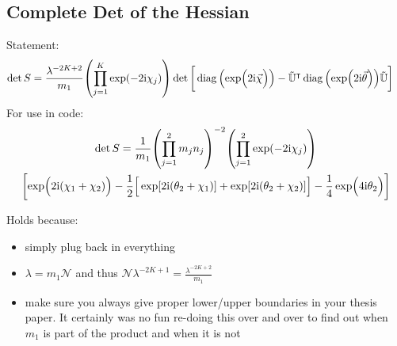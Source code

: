 \documentclass[
	english,
	a4paper,
	fontsize=10pt,
	parskip=half,
	titlepage=true,
	DIV=12,
	final
]{scrreprt}
\newcommand*{\transp}{\ensuremath{^\intercal}}
\newcommand*{\iunit}{\ensuremath{\mathrm{i}}}
\DeclareMathOperator{\diag}{diag}
\begin{document}
\subsection{Complete Det of the Hessian}
Statement:
\begin{align}
	\det S
&=
	\frac{ \lambda^{-2K+2} }{ m_1 }
	\qty( \prod_{j=1}^{K} \exp(-2\iunit \chi_j) )
	\det\qty[\bigg.
		\diag\qty(\exp(\Big.2\iunit\vec{\chi}))
		-
		\tilde{\mathbb{U}}\transp
		\diag\qty(\exp(2\iunit\vec{\theta}))
		\tilde{\mathbb{U}}
	]
\label{eqn:detComplete}
\end{align}
For use in code:
\begin{multline*}
	\det S
=
	\frac{1}{m_1}
	\qty( \prod_{j=1}^{2} m_j n_j)^{-2}
	\qty( \prod_{j=1}^{2} \exp(-2\iunit \chi_j) )
\\
	\qty[
		\exp( \Big. 2\iunit (\chi_1 + \chi_2) )
		-\frac{1}{2} \qty[ \Big.
			\exp[2\iunit (\theta_2 + \chi_1)] +
			\exp[2\iunit (\theta_2 + \chi_2)]
		]
		-
		\frac{1}{4}\exp( \Big. 4\iunit \theta_2 )
	]
\end{multline*}

Holds because:
\begin{itemize}
\item simply plug back in everything
\item $\lambda = m_1 \mathcal{N}$ 
	and thus 
	$\mathcal{N} \lambda^{-2K+1} = \frac{ \lambda^{-2K+2} }{ m_1 }$
\item \color{red} make sure you always give proper lower/upper boundaries in your thesis paper. It certainly was no fun re-doing this over and over to find out when $m_1$ is part of the product and when it is not
\end{itemize}
\end{document}
